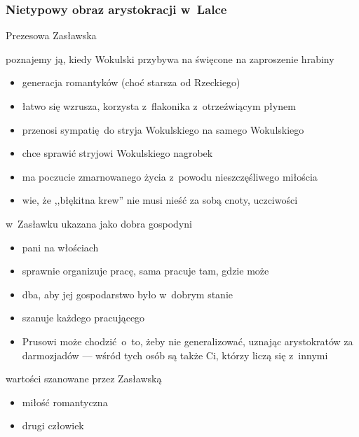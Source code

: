 \subsubsection*{Nietypowy obraz arystokracji w~Lalce}
\begin{description}
    \item Prezesowa Zasławska
        \begin{description}
            \item poznajemy ją, kiedy Wokulski przybywa na święcone na zaproszenie hrabiny
                \begin{itemize}
                    \item generacja romantyków (choć starsza od Rzeckiego)
                    \item łatwo się wzrusza, korzysta z~flakonika z~otrzeźwiącym płynem
                    \item przenosi sympatię do stryja Wokulskiego na samego Wokulskiego
                    \item chce sprawić stryjowi Wokulskiego nagrobek
                    \item ma poczucie zmarnowanego życia z~powodu nieszczęśliwego miłościa
                    \item wie, że ,,błękitna krew'' nie musi nieść za sobą cnoty, uczciwości
                \end{itemize}
            \item w~Zasławku ukazana jako dobra gospodyni
                \begin{itemize}
                    \item pani na włościach
                    \item sprawnie organizuje pracę, sama pracuje tam, gdzie może
                    \item dba, aby jej gospodarstwo było w~dobrym stanie
                    \item szanuje każdego pracującego
                    \item Prusowi może chodzić o~to, żeby nie generalizować, uznając arystokratów za darmozjadów --- wśród tych osób są także Ci, którzy liczą się z~innymi
                \end{itemize}
            \item wartości szanowane przez Zasławską
                \begin{itemize}
                    \item miłość romantyczna
                    \item drugi człowiek

\end{itemize}
\end{description}
\end{description}

